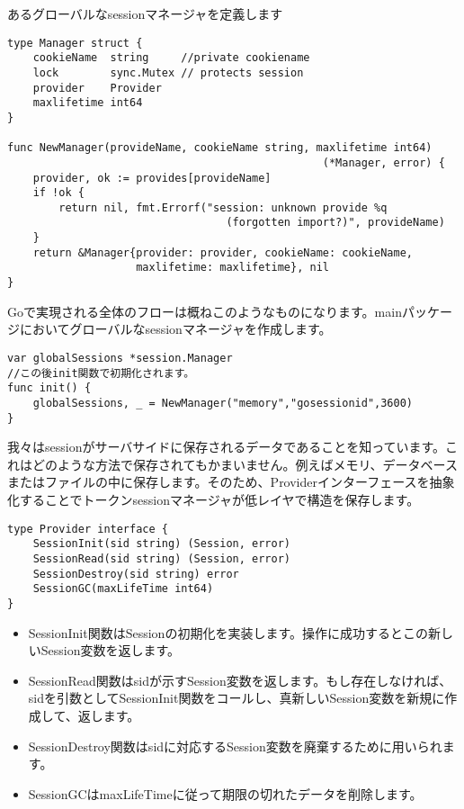 あるグローバルなsessionマネージャを定義します

\begin{lstlisting}[numbers=none]
type Manager struct {
    cookieName  string     //private cookiename
    lock        sync.Mutex // protects session
    provider    Provider
    maxlifetime int64
}

func NewManager(provideName, cookieName string, maxlifetime int64)
                                                 (*Manager, error) {
    provider, ok := provides[provideName]
    if !ok {
        return nil, fmt.Errorf("session: unknown provide %q
                                  (forgotten import?)", provideName)
    }
    return &Manager{provider: provider, cookieName: cookieName,
                    maxlifetime: maxlifetime}, nil
}
\end{lstlisting}

Goで実現される全体のフローは概ねこのようなものになります。mainパッケージにおいてグローバルなsessionマネージャを作成します。

\begin{lstlisting}[numbers=none]
var globalSessions *session.Manager
//この後init関数で初期化されます。
func init() {
    globalSessions, _ = NewManager("memory","gosessionid",3600)
}
\end{lstlisting}

我々はsessionがサーバサイドに保存されるデータであることを知っています。これはどのような方法で保存されてもかまいません。例えばメモリ、データベースまたはファイルの中に保存します。そのため、Providerインターフェースを抽象化することでトークンsessionマネージャが低レイヤで構造を保存します。

\begin{lstlisting}[numbers=none]
type Provider interface {
    SessionInit(sid string) (Session, error)
    SessionRead(sid string) (Session, error)
    SessionDestroy(sid string) error
    SessionGC(maxLifeTime int64)
}
\end{lstlisting}

\begin{itemize}
  \item SessionInit関数はSessionの初期化を実装します。操作に成功するとこの新しいSession変数を返します。
  \item SessionRead関数はsidが示すSession変数を返します。もし存在しなければ、sidを引数としてSessionInit関数をコールし、真新しいSession変数を新規に作成して、返します。
  \item SessionDestroy関数はsidに対応するSession変数を廃棄するために用いられます。
  \item SessionGCはmaxLifeTimeに従って期限の切れたデータを削除します。
\end{itemize}

